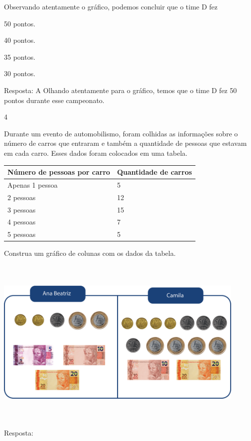 \begin{multicols}{2}
{\begin{escolha}
{Observando atentamente o gráfico, podemos concluir que o time D fez

\begin{escolha}
\item
  50 pontos.
\item
  40 pontos.
\item
  35 pontos.
\item
  30 pontos.
\end{escolha}

Resposta: A
Olhando atentamente para o gráfico, temos que o time D fez 50 pontos
durante esse campeonato.

\num{4}

Durante um evento de automobilismo, foram colhidas as informações sobre o número de carros
que entraram e também a quantidade de pessoas que estavam em cada carro.
Esses dados foram colocados em uma tabela.

\begin{longtable}[]{@{}ll@{}}
\toprule
Número de pessoas por carro & Quantidade de carros\tabularnewline
\midrule
\endhead
Apenas 1 pessoa & 5\tabularnewline
2 pessoas & 12\tabularnewline
3 pessoas & 15\tabularnewline
4 pessoas & 7\tabularnewline
5 pessoas & 5\tabularnewline
\bottomrule
\end{longtable}

Construa um gráfico de colunas com os dados da tabela.


\includegraphics[width=4.76708in,height=3.21695in]{media/image95.png}

Resposta:

}
\end{escolha}}
\end{multicols}
